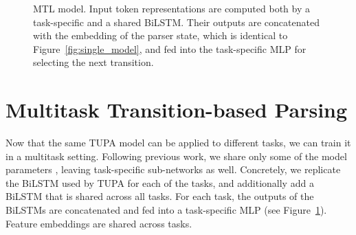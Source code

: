 \documentclass[11pt,a4paper]{article}
\begin{document}
\begin{figure}[t]
   \caption{MTL model.
      Input token representations are computed both by a task-specific and a shared BiLSTM.
      Their outputs are concatenated with the embedding of the parser state,
      which is identical to Figure~\ref{fig:single_model},
      and fed into the task-specific MLP for selecting the next transition.
      }
   \label{fig:multi_model}
\end{figure}


\section{Multitask Transition-based Parsing}\label{sec:multitask}

Now that the same TUPA model can be applied to different tasks, 
we can train it in a multitask setting.
Following previous work, we share only some of the model parameters
\cite{N16-1179,P16-2038,C16-1013,C16-1059,C16-1179,E17-1005,P17-1186}, leaving task-specific
sub-networks as well.
Concretely, we replicate the BiLSTM used by TUPA for each of the tasks, and additionally add
a BiLSTM that is shared across all tasks. 
For each task, the outputs of the BiLSTMs are concatenated and
fed into a task-specific MLP (see Figure~\ref{fig:multi_model}).
Feature embeddings are shared across tasks.
\end{document}
